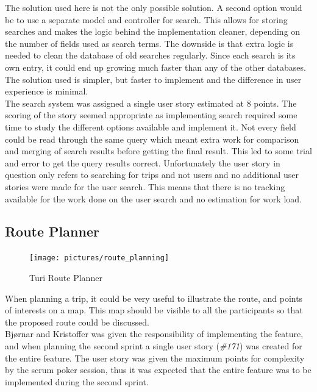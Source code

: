 \documentclass[a4paper]{article}
\begin{document}
\noindent
The solution used here is not the only possible solution. A second option would be to use a separate model and controller for search. This allows for storing searches and makes the logic behind the implementation cleaner, depending on the number of fields used as search terms. The downside is that extra logic is needed to clean the database of old searches regularly. Since each search is its own entry, it could end up growing much faster than any of the other databases. The solution used is simpler, but faster to implement and the difference in user experience is minimal.\\

\noindent
The search system was assigned a single user story estimated at 8 points. The scoring of the story seemed appropriate as implementing search required some time to study the different options available and implement it. Not every field could be read through the same query which meant extra work for comparison and merging of search results before getting the final result. This led to some trial and error to get the query results correct. Unfortunately the user story in question only refers to searching for trips and not users and no additional user stories were made for the user search. This means that there is no tracking available for the work done on the user search and no estimation for work load.


\subsection{Route Planner}

\begin{figure}[!h]
  \begin{center}
    \texttt{[image: pictures/route\_planning]}
  \end{center}
\caption{Turi Route Planner}
\label{fig:route}
\end{figure}

\noindent
When planning a trip, it could be very useful to illustrate the route, and points of interests on a map. This map should be visible to all the participants so that the proposed route could be discussed.\\

\noindent
Bjørnar and Kristoffer was given the responsibility of implementing the feature, and when planning the second sprint a single user story (\emph{\#171}) was created for the entire feature. The user story was given the maximum points for complexity by the scrum poker session, thus it was expected that the entire feature was to be implemented during the second sprint. \\
\end{document}
